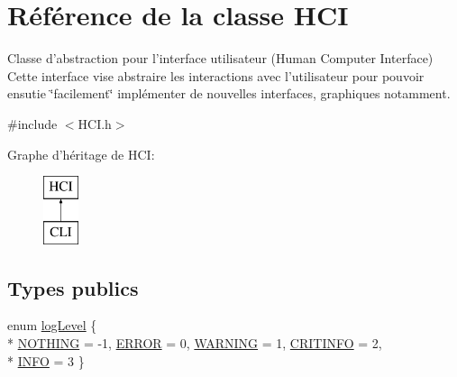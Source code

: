 \hypertarget{classHCI}{\section{Référence de la classe H\-C\-I}
\label{classHCI}
}


Classe d'abstraction pour l'interface utilisateur (Human Computer Interface) Cette interface vise abstraire les interactions avec l'utilisateur pour pouvoir ensutie \char`\"{}facilement\char`\"{} implémenter de nouvelles interfaces, graphiques notamment.  




{\ttfamily \#include $<$H\-C\-I.\-h$>$}

Graphe d'héritage de H\-C\-I\-:\begin{figure}[H]
\begin{center}
\leavevmode
\includegraphics[height=2.000000cm]{classHCI}
\end{center}
\end{figure}
\subsection*{Types publics}
\begin{DoxyCompactItemize}
\item 
enum \hyperlink{classHCI_a395f0ab7958108f23c34c7a04b56c4b0}{log\-Level} \{ \\*
\hyperlink{classHCI_a395f0ab7958108f23c34c7a04b56c4b0aa3b8d1d7f0361b9e659377b2aa6795b3}{N\-O\-T\-H\-I\-N\-G} =  -\/1, 
\hyperlink{classHCI_a395f0ab7958108f23c34c7a04b56c4b0acc4f9b9cc095c392851928025f83dbc6}{E\-R\-R\-O\-R} =  0, 
\hyperlink{classHCI_a395f0ab7958108f23c34c7a04b56c4b0ac168191728df302afd8cb6564e8d1a6d}{W\-A\-R\-N\-I\-N\-G} =  1, 
\hyperlink{classHCI_a395f0ab7958108f23c34c7a04b56c4b0a1748594a322cb093ed9324ad91fe2f0f}{C\-R\-I\-T\-I\-N\-F\-O} =  2, 
\\*
\hyperlink{classHCI_a395f0ab7958108f23c34c7a04b56c4b0ab3f339d63b08c4a353f0f6609366d6a2}{I\-N\-F\-O} =  3
 \}
\end{DoxyCompactItemize}
